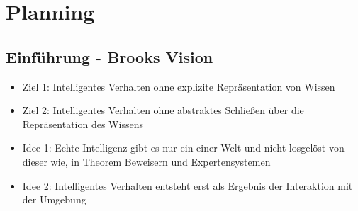 \documentclass{article} %
\begin{document}
\section{Planning}
	\subsection{Einführung - Brooks Vision}
	\begin{itemize}
		\item Ziel 1: Intelligentes Verhalten ohne explizite Repräsentation von Wissen
		\item Ziel 2: Intelligentes Verhalten ohne abstraktes Schließen über die Repräsentation des Wissens
		\item Idee 1: Echte Intelligenz gibt es nur ein einer Welt und nicht losgelöst von dieser wie, in Theorem Beweisern und Expertensystemen
		\item Idee 2: Intelligentes Verhalten entsteht erst als Ergebnis der Interaktion mit der Umgebung
	\end{itemize}
\end{document}
